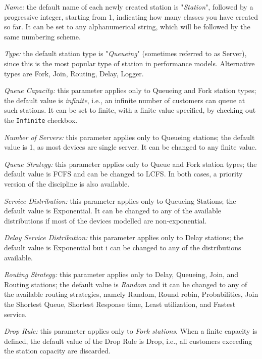 \begin{itemize*}
\item \emph{Name:} the default name of each newly created station
is "\emph{Station}", followed by a progressive integer, starting
from 1, indicating how many classes you have created so far. It
can be set to any alphanumerical string, which will be followed by
the same numbering scheme. \item \emph{Type:} the default station
type is "\emph{Queueing}" (sometimes referred to as Server), since
this is the most popular type of station in performance models.
Alternative types are Fork, Join, Routing, Delay, Logger. \item
\emph{Queue Capacity:} this parameter applies only to Queueing and
Fork station types; the default value is \emph{infinite}, i.e., an
infinite number of customers can queue at such stations. It can be
set to finite, with a finite value specified, by checking out the
\texttt{Infinite} checkbox. \item \emph{Number of Servers:} this
parameter applies only to Queueing stations; the default value is
1, as most devices are single server. It can be changed to any
finite value. \item \emph{Queue Strategy:} this parameter applies
only to Queue and Fork station types; the default value is FCFS
and can be changed to LCFS. In both cases, a priority version of
the discipline is also available. \item \emph{Service
Distribution:} this parameter applies only to Queueing Stations;
the default value is Exponential. It can be changed to any of the
available distributions if most of the devices modelled are
non-exponential. \item \emph{Delay Service Distribution:} this
parameter applies only to Delay stations; the default value is
Exponential but i can be changed to any of the distributions
available. \item \emph{Routing Strategy:} this parameter applies
only to Delay, Queueing, Join, and Routing stations; the default
value is \emph{Random} and it can be changed to any of the
available routing strategies, namely Random, Round robin,
Probabilities, Join the Shortest Queue, Shortest Response time,
Least utilization, and Fastest service. \item \emph{Drop Rule:}
this parameter applies only to \emph{Fork stations}. When a finite
capacity is defined, the default value of the Drop Rule is Drop,
i.e., all customers exceeding the station capacity are discarded.

\end{itemize*}
